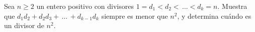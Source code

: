 Sea $n\geq2$ un entero positivo con divisores $1=d_1\lt d_2\lt\,\ldots\lt d_k=n$. Muestra que $d_1d_2+d_2d_3+\,\ldots\,+d_{k-1}d_k$ siempre es menor que $n^2$, y determina cuándo es un divisor de $n^2$.